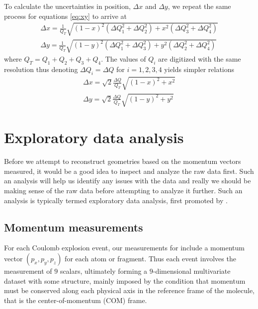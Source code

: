 To calculate the uncertainties in position, $\Delta x$ and $\Delta y$, we repeat the same process for equations \eqref{eq:xy} to arrive at
\begin{subequations}
\begin{align}
\Delta x = \frac{1}{Q_T} \sqrt{ (1-x)^2 (\Delta Q_1^2 + \Delta Q_2^2) + x^2 (\Delta Q_3^2 + \Delta Q_4^2)} \\  
\Delta y = \frac{1}{Q_T} \sqrt{ (1-y)^2 (\Delta Q_1^2 + \Delta Q_3^2) + y^2 (\Delta Q_2^2 + \Delta Q_4^2)}
\end{align}
\end{subequations}
where $Q_T = Q_1 + Q_2 + Q_3 + Q_4$. The values of $Q_i$ are digitized with the same resolution thus denoting $\Delta Q_i = \Delta Q$ for $i=1,2,3,4$ yields simpler relations
\begin{subequations}
  \begin{align}
  \Delta x = \sqrt{2} \frac{\Delta Q}{Q_T} \sqrt{(1-x)^2 + x^2} \\
  \Delta y = \sqrt{2} \frac{\Delta Q}{Q_T} \sqrt{(1-y)^2 + y^2}
  \end{align}
\end{subequations}


\section{Exploratory data analysis}
Before we attempt to reconstruct geometries based on the momentum vectors measured, it would be a good idea to inspect and analyze the raw data first. Such an analysis will help us identify any issues with the data and really we should be making sense of the raw data before attempting to analyze it further. Such an analysis is typically termed exploratory data analysis, first promoted by \citet{Tukey77}.

\subsection{Momentum measurements}
For each Coulomb explosion event, our measurements for  include a momentum vector $(p_x, p_y, p_z)$ for each atom or fragment. Thus each event involves the measurement of $9$ scalars, ultimately forming a $9$-dimensional multivariate dataset with some structure, mainly imposed by the condition that momentum must be conserved along each physical axis in the reference frame of the molecule, that is the center-of-momentum (COM) frame.

